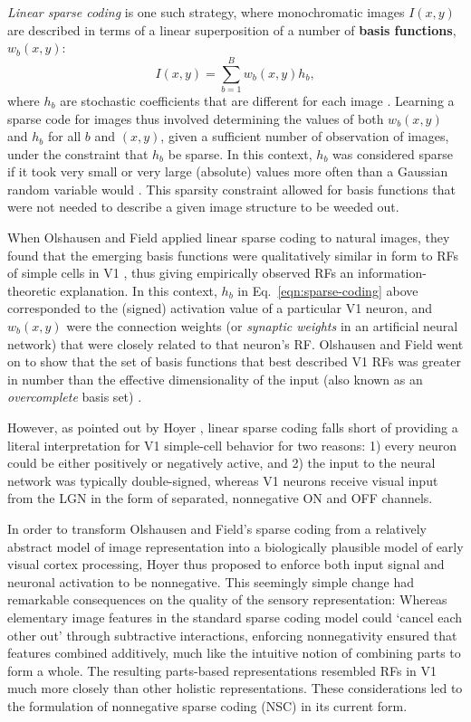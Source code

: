 \emph{Linear sparse coding} is one such strategy,
where monochromatic images $I(x,y)$
are described in terms of a linear superposition of
a number of \textbf{basis functions},
$w_b(x,y)$:
\begin{equation}
I(x,y) = \sum^B_{b=1} w_b(x,y) h_b,
\label{eqn:sparse-coding}
\end{equation}
where $h_b$ are stochastic coefficients that are different for each image
\cite{OlshausenField1996,Hyvarinen2001}.
Learning a sparse code for images thus involved determining
the values of both $w_b(x,y)$ and $h_b$ for all $b$ and $(x,y)$,
given a sufficient number of observation of images,
under the constraint that $h_b$ be sparse.
In this context, $h_b$ was considered sparse if it took very small
or very large (absolute) values more often than a Gaussian random
variable would \cite{Hyvarinen2001}.
This sparsity constraint allowed for basis functions that were not
needed to describe a given image structure to be weeded out.

When Olshausen and Field applied linear sparse coding 
to natural images,
they found that the emerging basis functions 
were qualitatively similar in form
to \acp{RF} of simple cells in \ac{V1} 
\cite{OlshausenField1996,OlshausenField1997},
thus giving empirically observed \acp{RF} 
an information-theoretic explanation.
In this context, $h_b$ in Eq.~\ref{eqn:sparse-coding} above
corresponded to the (signed) activation value of a particular \ac{V1}
neuron, and $w_b(x,y)$ were the connection weights
(or \emph{synaptic weights} in an artificial neural network)
that were closely related to that neuron's \ac{RF}.
Olshausen and Field went on to show that 
the set of basis functions that best described \ac{V1} \acp{RF} 
was greater in number than the effective
dimensionality of the input (also known as an \emph{overcomplete}
basis set) \cite{OlshausenField1997}.

However, as pointed out by Hoyer \cite{Hoyer2003}, 
linear sparse coding falls short of providing a literal interpretation
for \ac{V1} simple-cell behavior for two reasons:
1) every neuron could be either positively or negatively active, and
2) the input to the neural network was typically double-signed,
whereas \ac{V1} neurons receive visual input from the \ac{LGN} 
in the form of separated, nonnegative ON and OFF channels.

In order to transform Olshausen and Field's sparse coding
from a relatively abstract model of image representation 
into a biologically plausible model of early visual cortex processing,
Hoyer \cite{Hoyer2002,Hoyer2003} thus proposed to enforce
both input signal and neuronal activation to be nonnegative.
This seemingly simple change had remarkable consequences 
on the quality of the sensory representation:
Whereas elementary image features in the standard sparse coding model
could `cancel each other out' through subtractive interactions,
enforcing nonnegativity ensured that features combined additively,
much like the intuitive notion of combining parts to form a whole.
The resulting parts-based representations resembled \acp{RF} in \ac{V1} 
much more closely than other holistic representations.
These considerations led to the formulation of nonnegative sparse coding (\ac{NSC}) in its current form.


